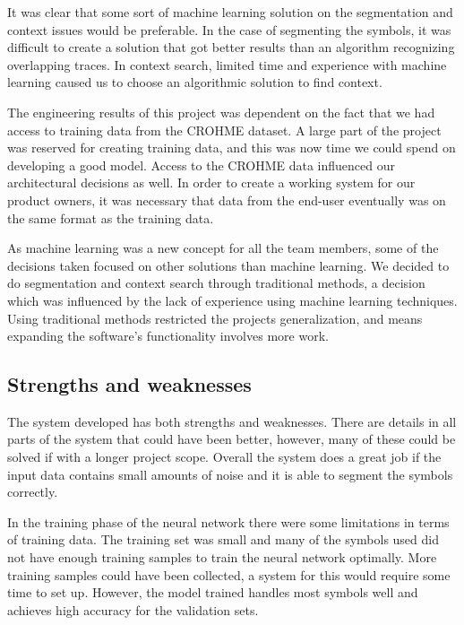 It was clear that some sort of machine learning solution on the segmentation and context issues would be preferable. In the case of segmenting the symbols, it was difficult to create a solution that got better results than an algorithm recognizing overlapping traces. In context search, limited time and experience with machine learning caused us to choose an algorithmic solution to find context.

The engineering results of this project was dependent on the fact that we had access to training data from the CROHME dataset. A large part of the project was reserved for creating training data, and this was now time we could spend on developing a good model. Access to the CROHME data influenced our architectural decisions as well. In order to create a working system for our product owners, it was necessary that data from the end-user eventually was on the same format as the training data.

As machine learning was a new concept for all the team members, some of the decisions taken focused on other solutions than machine learning. We decided to do segmentation and context search through traditional methods, a decision which was influenced by the lack of experience using machine learning techniques. Using traditional methods restricted the projects generalization, and means expanding the software's functionality involves more work.

\subsection{Strengths and weaknesses}

The system developed has both strengths and weaknesses. There are details in all parts of the system that could have been better, however, many of these could be solved if with a longer project scope. Overall the system does a great job if the input data contains small amounts of noise and it is able to segment the symbols correctly.

In the training phase of the neural network there were some limitations in terms of training data. The training set was small and many of the symbols used did not have enough training samples to train the neural network optimally. More training samples could have been collected, a system for this would require some time to set up. However, the model trained handles most symbols well and achieves high accuracy for the validation sets.

